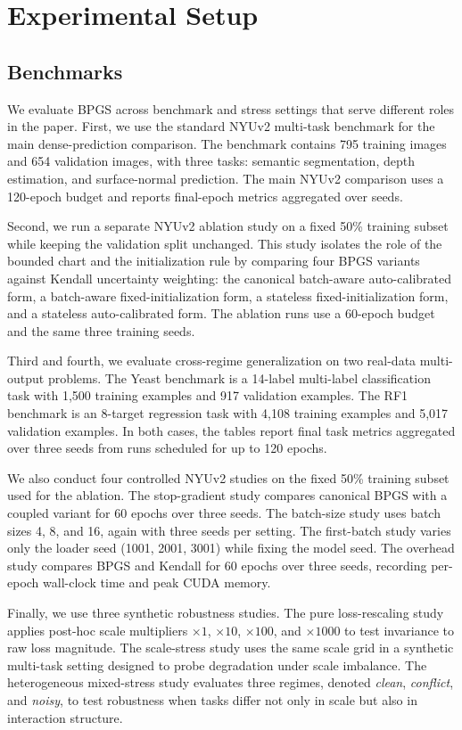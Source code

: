 \section{Experimental Setup}
\subsection{Benchmarks}
We evaluate BPGS across benchmark and stress settings that serve different roles in the paper. First, we use the standard NYUv2 multi-task benchmark \cite{silberman2012nyuv2} for the main dense-prediction comparison. The benchmark contains 795 training images and 654 validation images, with three tasks: semantic segmentation, depth estimation, and surface-normal prediction. The main NYUv2 comparison uses a 120-epoch budget and reports final-epoch metrics aggregated over seeds.

Second, we run a separate NYUv2 ablation study on a fixed 50\% training subset while keeping the validation split unchanged. This study isolates the role of the bounded chart and the initialization rule by comparing four BPGS variants against Kendall uncertainty weighting: the canonical batch-aware auto-calibrated form, a batch-aware fixed-initialization form, a stateless fixed-initialization form, and a stateless auto-calibrated form. The ablation runs use a 60-epoch budget and the same three training seeds.

Third and fourth, we evaluate cross-regime generalization on two real-data multi-output problems. The Yeast benchmark \cite{elisseeff2001yeast} is a 14-label multi-label classification task with 1,500 training examples and 917 validation examples. The RF1 benchmark \cite{spyromitros2016mtr} is an 8-target regression task with 4,108 training examples and 5,017 validation examples. In both cases, the tables report final task metrics aggregated over three seeds from runs scheduled for up to 120 epochs.

We also conduct four controlled NYUv2 studies on the fixed 50\% training subset used for the
ablation. The stop-gradient study compares canonical BPGS with a coupled variant for 60 epochs
over three seeds. The batch-size study uses batch sizes 4, 8, and 16, again with three seeds per
setting. The first-batch study varies only the loader seed (1001, 2001, 3001) while fixing the
model seed. The overhead study compares BPGS and Kendall for 60 epochs over three seeds, recording
per-epoch wall-clock time and peak CUDA memory.

Finally, we use three synthetic robustness studies. The pure loss-rescaling study applies post-hoc scale multipliers $\times 1$, $\times 10$, $\times 100$, and $\times 1000$ to test invariance to raw loss magnitude. The scale-stress study uses the same scale grid in a synthetic multi-task setting designed to probe degradation under scale imbalance. The heterogeneous mixed-stress study evaluates three regimes, denoted \emph{clean}, \emph{conflict}, and \emph{noisy}, to test robustness when tasks differ not only in scale but also in interaction structure.

